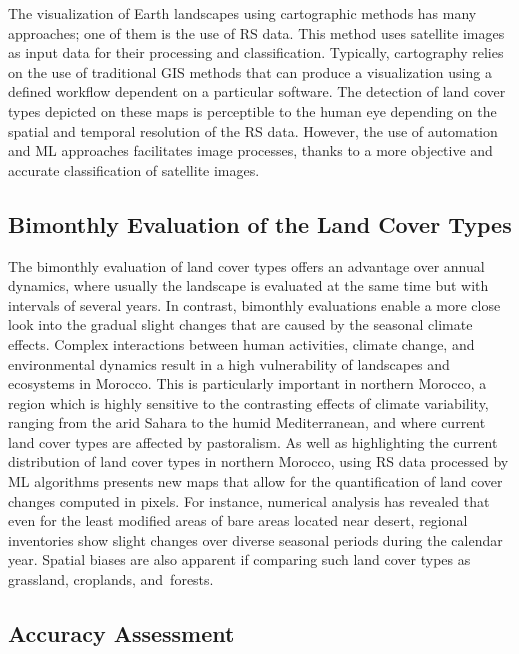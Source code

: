 \documentclass[geomatics,article,accept,pdftex,oneauthor]{Definitions/mdpi}
\begin{document}
The visualization of Earth landscapes using cartographic methods has many approaches; one of them is the use of RS data. This method uses satellite images as input data for their processing and classification. Typically, cartography relies on the use of traditional GIS methods that can produce a visualization using a defined workflow dependent on a particular software. The detection of land cover types depicted on these maps is perceptible to the human eye depending on the spatial and temporal resolution of the RS data. However, the use of automation and ML approaches facilitates image processes, thanks to a more objective and accurate classification of satellite images.

\subsection{{Bimonthly Evaluation of the Land Cover Types}}

{The bimonthly evaluation of land cover types offers an advantage over annual dynamics, where usually the landscape is evaluated at the same time but with intervals of several years. In contrast, bimonthly evaluations enable a more close look into the gradual slight changes that are caused by the seasonal climate effects. }Complex interactions between human activities, climate change, and environmental dynamics result in a high vulnerability of landscapes and ecosystems in Morocco. This is particularly important in northern Morocco, a region which is highly sensitive to the contrasting effects of climate variability, ranging from the arid Sahara to the humid Mediterranean, and where current land cover types are affected by pastoralism. As well as highlighting the current distribution of land cover types in northern Morocco, using RS data processed by ML algorithms presents new maps that allow for the quantification of land cover changes computed in pixels. For instance, numerical analysis has revealed that even for the least modified areas of bare areas located near desert, regional inventories show slight changes over diverse seasonal periods during the calendar year. Spatial biases are also apparent if comparing such land cover types as grassland, croplands, \mbox{and forests.}

\subsection{{Accuracy Assessment}}
\end{document}
